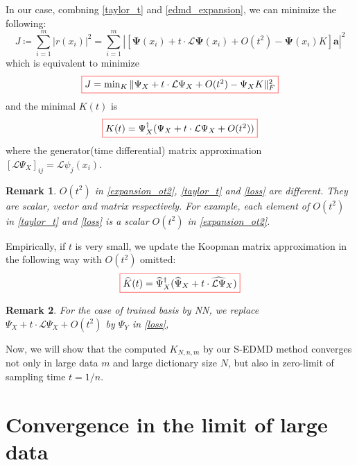 \documentclass{article}[11]
\newtheorem*{remark}{Remark}
\begin{document}
	In our case, combning \eqref{taylor_t} and \eqref{edmd_expansion}, we can minimize the following:
	\begin{equation*}
		J \coloneqq \sum_{i=1}^m \left| r(x_i) \right|^2 = \sum_{i=1}^m \left| \left[\mathbf{\Psi}(x_i) + t \cdot \mathcal{L}\mathbf{\Psi}(x_i) + O(t^2) - \mathbf{\Psi}(x_i)K\right]\mathbf{a} \right|^2
	\end{equation*}
	which is equivalent to minimize 
	\begin{equation}\label{loss}
		\fcolorbox{red}{white}{$J = \min_{K} \| \Psi_X + t \cdot \mathcal{L}\Psi_X + O(t^2) - \Psi_X K \|_F^2$}
	\end{equation}
	and the minimal $K(t)$ is
	\begin{equation}\label{Koopman_semigroup_formula}
		\fcolorbox{red}{white}{$K(t) = \Psi_X^{\dagger}(\Psi_X + t \cdot \mathcal{L}\Psi_X + O(t^2))$}
	\end{equation}
	where the generator(time differential) matrix approximation $\left[\mathcal{L}\Psi_X\right]_{ij} = \mathcal{L}\psi_j(x_i)$. 
	\begin{remark}
		$O(t^2)$ in \eqref{expansion_ot2}, \eqref{taylor_t} and \eqref{loss} are different. They are scalar, vector and matrix respectively. For example, each element of $O(t^2)$ in \eqref{taylor_t} and \eqref{loss} is a scalar $O(t^2)$ in \eqref{expansion_ot2}.
	\end{remark}
	
	Empirically, if $t$ is very small, we update the Koopman matrix approximation in the following way with $O(t^2)$ omitted:
	\begin{equation*}
		\fcolorbox{red}{white}{$\widehat{K}(t) = \widehat{\Psi}_X^{\dagger}(\widehat{\Psi}_X + t \cdot \widehat{\mathcal{L}\Psi}_X)$}
	\end{equation*}
	\begin{remark}
		For the case of trained basis by NN, we replace $\Psi_X + t \cdot \mathcal{L}\Psi_X + O(t^2)$ by $\Psi_Y$ in \eqref{loss}, 
	\end{remark}
	
	Now, we will show that the computed $K_{N,n,m}$ by our S-EDMD method converges not only in large data $m$ and large dictionary size $N$, but also in zero-limit of sampling time $t=1/n$.
	
	\newpage
	\section{Convergence in the limit of large data}
	
\end{document}

